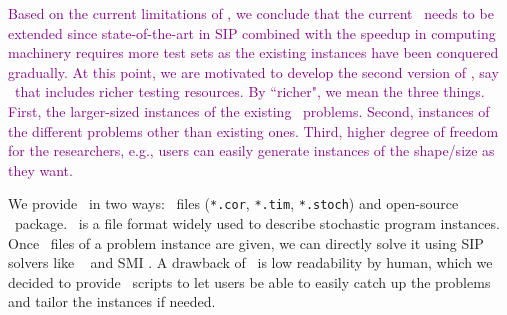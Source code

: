 \textcolor{purple}{Based on the current limitations of \siplib, we conclude that the current \siplib\ needs to be extended since state-of-the-art in SIP combined with the speedup in computing machinery requires more test sets as the existing instances have been conquered gradually. At this point, we are motivated to develop the second version of \siplib, say \siplibtwo\ that includes richer testing resources. By ``richer", we mean the three things. First, the larger-sized instances of the existing \siplib\ problems. Second, instances of the different problems other than existing ones. Third, higher degree of freedom for the researchers, e.g., users can easily generate instances of the shape/size as they want.}

We provide \siplibtwo\ in two ways: \smps\ files (\texttt{*.cor}, \texttt{*.tim}, \texttt{*.stoch}) and open-source \julia\ package. \smps\ is a file format widely used to describe stochastic program instances. Once \smps\ files of a problem instance are given, we can directly solve it using SIP solvers like \dsp\ \cite{journal:KZ2015} and \textsf{SMI} \cite{web:SMI}. A drawback of \smps\ is low readability by human, which we decided to provide \julia\ scripts to let users be able to easily catch up the problems and tailor the instances if needed.

